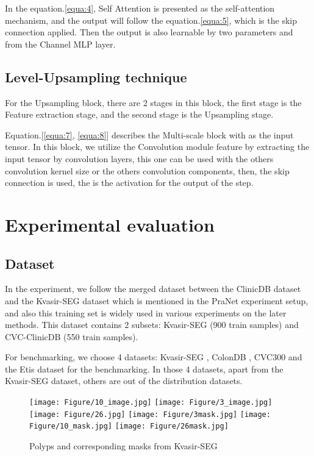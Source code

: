 \documentclass[conference]{IEEEtran}
\begin{document}
In the equation.\ref{equa:4}, Self Attention is presented as the self-attention mechanism, and the output will follow the equation.\ref{equa:5}, which is the skip connection applied. Then the output is also learnable by two parameters  and  from the Channel MLP layer.

\subsection{Level-Upsampling technique}

For the Upsampling block, there are 2 stages in this block, the first stage is the Feature extraction stage, and the second stage is the Upsampling stage. 





Equation.[\ref{equa:7}, \ref{equa:8}] describes the Multi-scale block with  as the input tensor. In this block, we utilize the Convolution module feature by extracting the input tensor by convolution layers, this one can be used with the others convolution kernel size or the others convolution components, then, the skip connection is used, the  is the activation for the output of the step.

\section{Experimental evaluation}
\subsection{Dataset}






In the experiment, we follow the merged dataset between the ClinicDB dataset and the Kvasir-SEG dataset \cite{jha2020medico} which is mentioned in the PraNet \cite{pranet} experiment setup, and also this training set is widely used in various experiments on the later methods. This dataset contains 2 subsets: Kvasir-SEG \cite{jha2020medico} (900 train samples) and CVC-ClinicDB \cite{cvc300} (550 train samples).

For benchmarking, we choose 4 datasets: Kvasir-SEG \cite{jha2020medico}, ColonDB \cite{colondb}, CVC300 \cite{cvc300} and the Etis \cite{etis} dataset for the benchmarking. In those 4 datasets, apart from the Kvasir-SEG \cite{jha2020medico} dataset, others are out of the distribution datasets.

\begin{figure}[ht]
    \centering
    \texttt{[image: Figure/10\_image.jpg]}
    \texttt{[image: Figure/3\_image.jpg]}
    \texttt{[image: Figure/26.jpg]}
    \texttt{[image: Figure/3mask.jpg]}
    \texttt{[image: Figure/10\_mask.jpg]}
    \texttt{[image: Figure/26mask.jpg]}
    \caption{Polyps and corresponding masks from Kvasir-SEG}  
    \label{fig:images}
\end{figure}
\end{document}

